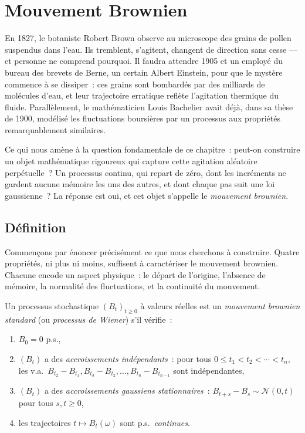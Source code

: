\chapter{Mouvement Brownien}
\label{ch:brownien}

En 1827, le botaniste Robert Brown observe au microscope des grains de pollen
suspendus dans l'eau. Ils tremblent, s'agitent, changent de direction sans
cesse --- et personne ne comprend pourquoi. Il faudra attendre 1905 et un
employ\'e du bureau des brevets de Berne, un certain Albert Einstein, pour que
le myst\`ere commence \`a se dissiper~: ces grains sont bombard\'es par des
milliards de mol\'ecules d'eau, et leur trajectoire erratique refl\`ete
l'agitation thermique du fluide. Parall\`element, le math\'ematicien Louis
Bachelier avait d\'ej\`a, dans sa th\`ese de 1900, mod\'elis\'e les fluctuations
boursi\`eres par un processus aux propri\'et\'es remarquablement similaires.

Ce qui nous am\`ene \`a la question fondamentale de ce chapitre~: peut-on
construire un objet math\'ematique rigoureux qui capture cette agitation
al\'eatoire perp\'etuelle~? Un processus continu, qui repart de z\'ero, dont
les incr\'ements ne gardent aucune m\'emoire les uns des autres, et dont
chaque pas suit une loi gaussienne~? La r\'eponse est oui, et cet objet
s'appelle le \emph{mouvement brownien}.

\section{D\'efinition}

Commen\c{c}ons par \'enoncer pr\'ecis\'ement ce que nous cherchons \`a construire.
Quatre propri\'et\'es, ni plus ni moins, suffisent \`a caract\'eriser le mouvement
brownien. Chacune encode un aspect physique~: le d\'epart de l'origine,
l'absence de m\'emoire, la normalit\'e des fluctuations, et la continuit\'e
du mouvement.

\begin{definition}
\label{def:brownien}
Un processus stochastique $(B_t)_{t \geq 0}$ \`a valeurs r\'eelles est un
\emph{mouvement brownien standard} (ou \emph{processus de Wiener}) s'il v\'erifie~:
\begin{enumerate}
  \item $B_0 = 0$ p.s.,
  \item $(B_t)$ a des \emph{accroissements ind\'ependants}~: pour tous
    $0 \leq t_1 < t_2 < \cdots < t_n$, les v.a.\
    $B_{t_2} - B_{t_1}, B_{t_3} - B_{t_2}, \ldots, B_{t_n} - B_{t_{n-1}}$
    sont ind\'ependantes,
  \item $(B_t)$ a des \emph{accroissements gaussiens stationnaires}~:
    $B_{t+s} - B_s \sim \mathcal{N}(0, t)$ pour tous $s, t \geq 0$,
  \item les trajectoires $t \mapsto B_t(\omega)$ sont p.s.\ \emph{continues}.
\end{enumerate}
\end{definition}

